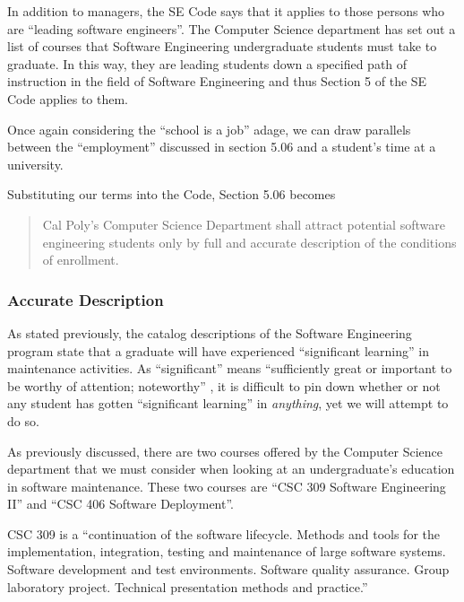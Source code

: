\documentclass[11pt]{article}
\begin{document}
\begin{multicols}{2}
In addition to managers, the SE Code says that it applies to those persons who are ``leading software engineers''.  The Computer Science department has set out a list of courses that Software Engineering undergraduate students must take to graduate. \cite{catalogDegree}  In this way, they are leading students down a specified path of instruction in the field of Software Engineering and thus Section 5 of the SE Code applies to them.

Once again considering the ``school is a job'' adage, we can draw parallels between the ``employment'' discussed in section 5.06 and a student's time at a university.

Substituting our terms into the Code, Section 5.06 becomes

\begin{quote}
Cal Poly's Computer Science Department shall attract potential software engineering students only by full and accurate description of the conditions of enrollment.
\end{quote}


\subsubsection{Accurate Description}

As stated previously, the catalog descriptions of the Software Engineering program state that a graduate will have experienced ``significant learning'' in maintenance activities. \cite{catalogDept}  As ``significant'' means ``sufficiently great or important to be worthy of attention; noteworthy'' \cite{definitionSignificant}, it is difficult to pin down whether or not any student has gotten ``significant learning'' in \emph{anything}, yet we will attempt to do so.

As previously discussed, there are two courses offered by the Computer Science department that we must consider when looking at an undergraduate's education in software maintenance.  These two courses are ``CSC 309 Software Engineering II'' and ``CSC 406 Software Deployment''.

CSC 309 is a ``continuation of the software lifecycle. Methods and tools for the implementation, integration, testing and maintenance of large software systems. Software development and test environments. Software quality assurance. Group laboratory project. Technical presentation methods and practice.'' \cite{catalogCourses}


\end{multicols}
\end{document}
